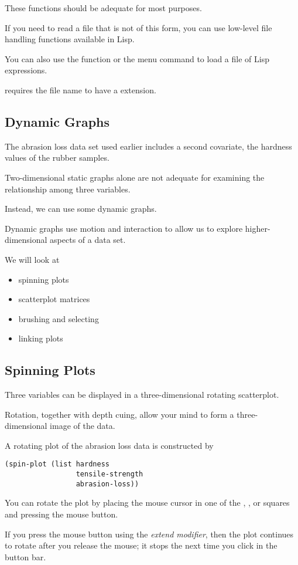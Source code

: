 \begin{slide}{}
These functions should be adequate for most purposes.

If you need to read a file that is not of this form, you can use
low-level file handling functions available in Lisp.

You can also use the  function or the  menu
command to load a file of Lisp expressions.

 requires the file name to have a  extension.

\end{slide}

\begin{slide}{}
\section{Dynamic Graphs}
The abrasion loss data set used earlier includes a second covariate,
the hardness values of the rubber samples.

Two-dimensional static graphs alone are not adequate for examining the
relationship among three variables.

Instead, we can use some dynamic graphs.

Dynamic graphs use motion and interaction to allow us to explore
higher-dimensional aspects of a data set.

We will look at
\begin{itemize}
\item spinning plots
\item scatterplot matrices
\item brushing and selecting
\item linking plots
\end{itemize}
\end{slide}

\begin{slide}{}
\subsection{Spinning Plots}
Three variables can be displayed in a three-dimensional rotating
scatterplot.

Rotation, together with depth cuing, allow your mind to form a
three-dimensional image of the data.

A rotating plot of the abrasion loss data is constructed by
\begin{verbatim}
(spin-plot (list hardness
                 tensile-strength
                 abrasion-loss))
\end{verbatim}
You can rotate the plot by placing the mouse cursor in one of the
, , or  squares and pressing the
mouse button.

If you press the mouse button using the {\em extend modifier}, then
the plot continues to rotate after you release the mouse; it stops the
next time you click in the button bar.
\end{slide}

